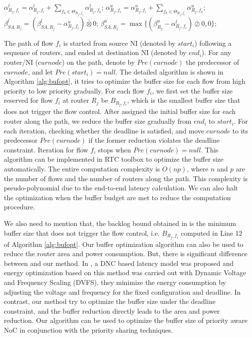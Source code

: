 \documentclass[10pt,journal]{IEEEtran}
\begin{document}
\begin{algorithm}
\begin{algorithmic}[1]
                    \STATE $\alpha^l_{R_j,f_i}=\alpha^l_{R_j,f_i}+\sum_{f_k\in\Theta_{R_j,f_i}}\alpha^l_{R_j,f_k}$;
                    \STATE $\alpha^u_{R_j,f_i}=\alpha^u_{R_j,f_i}+\sum_{f_k\in\Theta_{R_j,f_i}}\alpha^u_{R_j,f_k}$;
                \ENDIF
                \STATE $\beta^{l^\prime}_{SA,R_j}=(\beta^l_{SA,R_j}-\alpha^u_{R_j,f_i})\bar{\otimes}0$;
                \STATE $\beta^{u^\prime}_{SA,R_j}=\max\{(\beta^u_{R_j}-\alpha^l_{R_j,f_i})\bar{\oslash}0,0\}$;
            \ENDIF
        \ENDFOR
    \ENDFOR
\end{algorithmic}
\end{algorithm}

The path of flow $f_i$ is started from source NI (denoted by $start_i$) following a sequence of routers, and ended at destination NI (denoted by $end_i$). For any router/NI ($curnode$) on the path, denote by $Pre(curnode)$ the predecessor of $curnode$, and let $Pre(start_i)=null$. The detailed algorithm is shown in Algorithm \ref{alg:bufopt}, it tries to optimize the buffer size for each flow from high priority to low priority gradually. For each flow $f_i$, we first set the buffer size reserved for flow $f_i$ at router $R_j$ be $B_{R_j,f_i}$, which is the smallest buffer size that does not trigger the flow control. After assigned the initial buffer size for each router along the path, we reduce the buffer size gradually from $end_i$ to $start_i$. For each iteration, checking whether the deadline is satisfied, and move $curnode$ to its predecessor $Pre(curnode)$ if the former reduction violates the deadline constraint. Iteration for flow $f_i$ stops when $Pre(curnode)=null$. This algorithm can be implemented in RTC toolbox \cite{rtc} to optimize the buffer size automatically. The entire computation complexity is $O(np)$, where $n$ and $p$ are the number of flows and the number of routers along the path. This complexity is pseudo-polynomial due to the end-to-end latency calculation. We can also halt the optimization when the buffer budget are met to reduce the computation procedure.

We also need to mention that, the backlog bound obtained in \cite{189} is the minimum buffer size that does not trigger the flow control, i.e. $B_{R_j,f_i}$ computed in Line 12 of Algorithm \ref{alg:bufopt}. Our buffer optimization algorithm can also be used to reduce the router area and power consumption. But, there is significant difference between \cite{6560630} and our method. In \cite{6560630}, a DNC based latency model was proposed and energy optimization based on this method was carried out with Dynamic Voltage and Frequency Scaling (DVFS), they minimize the energy consumption by adjusting the voltage and frequency for the fixed configuration and deadline. In contrast, our method try to optimize the buffer size under the deadline constraint, and the buffer reduction directly leads to the area and power reduction. Our algorithm can be used to optimize the buffer size of priority aware NoC in conjunction with the priority sharing techniques.
\end{document}
